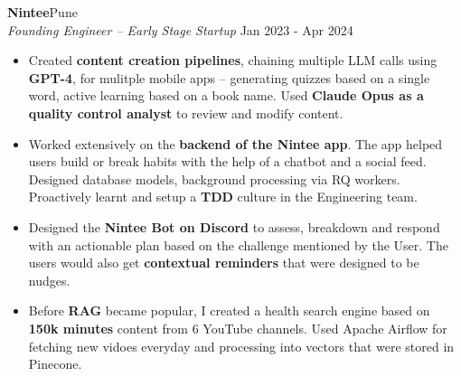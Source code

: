 \documentclass[a4paper]{article}
\begin{document}
\vspace*{2mm}

\vspace{1mm}
\textbf{Nintee}\hfill Pune\\
\textit{Founding Engineer -- Early Stage Startup} \hfill Jan 2023 - Apr 2024\\
\vspace{-1mm}
\begin{itemize} \itemsep 1pt
    \item Created \textbf{content creation pipelines}, chaining multiple LLM calls using \textbf{GPT-4}, for mulitple mobile apps -- generating quizzes based on a single word, active learning based on a book name. Used \textbf{Claude Opus as a quality control analyst} to review and modify content.
    \item Worked extensively on the \textbf{backend of the Nintee app}. The app helped users build or break habits with the help of a chatbot and a social feed. Designed database models, background processing via RQ workers. Proactively learnt and setup a \textbf{TDD} culture in the Engineering team.
    \item Designed the \textbf{Nintee Bot on Discord} to assess, breakdown and respond with an actionable plan based on the challenge mentioned by the User. The users would also get \textbf{contextual reminders} that were designed to be nudges.
    \item Before \textbf{RAG} became popular, I created a health search engine based on \textbf{150k minutes} content from 6 YouTube channels. Used Apache Airflow for fetching new vidoes everyday and processing into vectors that were stored in Pinecone. 
\end{itemize}

\vspace*{2mm}
\end{document}

